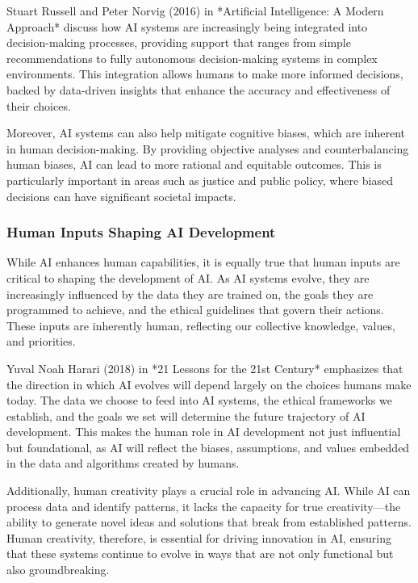 \documentclass[12pt,twoside]{article}
\begin{document}
Stuart Russell and Peter Norvig (2016) in *Artificial Intelligence: A Modern Approach* discuss how AI systems are increasingly being integrated into decision-making processes, providing support that ranges from simple recommendations to fully autonomous decision-making systems in complex environments. This integration allows humans to make more informed decisions, backed by data-driven insights that enhance the accuracy and effectiveness of their choices.

Moreover, AI systems can also help mitigate cognitive biases, which are inherent in human decision-making. By providing objective analyses and counterbalancing human biases, AI can lead to more rational and equitable outcomes. This is particularly important in areas such as justice and public policy, where biased decisions can have significant societal impacts.

\subsubsection{Human Inputs Shaping AI Development}

While AI enhances human capabilities, it is equally true that human inputs are critical to shaping the development of AI. As AI systems evolve, they are increasingly influenced by the data they are trained on, the goals they are programmed to achieve, and the ethical guidelines that govern their actions. These inputs are inherently human, reflecting our collective knowledge, values, and priorities.

Yuval Noah Harari (2018) in *21 Lessons for the 21st Century* emphasizes that the direction in which AI evolves will depend largely on the choices humans make today. The data we choose to feed into AI systems, the ethical frameworks we establish, and the goals we set will determine the future trajectory of AI development. This makes the human role in AI development not just influential but foundational, as AI will reflect the biases, assumptions, and values embedded in the data and algorithms created by humans.

Additionally, human creativity plays a crucial role in advancing AI. While AI can process data and identify patterns, it lacks the capacity for true creativity—the ability to generate novel ideas and solutions that break from established patterns. Human creativity, therefore, is essential for driving innovation in AI, ensuring that these systems continue to evolve in ways that are not only functional but also groundbreaking.
\end{document}
